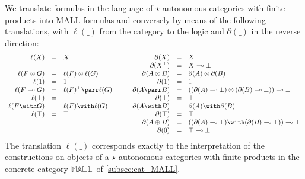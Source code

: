 \documentclass{lmcs}
\newcommand*{\orth}{^\perp} %
\newcommand*{\tens}{\otimes} %
\newcommand*{\lolipop}{\multimap} %
\newcommand*{\MALL}{\ensuremath{\mathbb{MALL}}}
\newcommand*{\tradm}[1]{\ell(#1)}
\newcommand*{\tradc}[1]{\partial(#1)}
\begin{document}
We translate formulas in the language of $\star$-autonomous categories with finite products into MALL formulas and conversely by means of the following translations, with $\tradm{\_}$ from the category to the logic and $\tradc{\_}$ in the reverse direction:
\begin{equation*}
\begin{array}{rcl@{\qquad\quad}rcl}
  \tradm{X} &=& X & \tradc{X} &=& X \\
  & & & \tradc{X\orth} &=& X\lolipop\bot \\
  \tradm{F\tens G} &=& \tradm{F}\tens\tradm{G} & \tradc{A\tens B} &=& \tradc{A}\tens\tradc{B} \\
  \tradm{1} &=& 1 & \tradc{1} &=& 1\\
  \tradm{F\lolipop G} &=& \tradm{F}\orth\parr\tradm{G} & \tradc{A\parr B} &=& ((\tradc{A}\lolipop\bot)\tens(\tradc{B}\lolipop\bot))\lolipop\bot \\
  \tradm{\bot} &=& \bot & \tradc{\bot} &=& \bot \\
  \tradm{F\with G} &=& \tradm{F}\with\tradm{G} & \tradc{A\with B} &=& \tradc{A}\with\tradc{B} \\
  \tradm{\top} &=& \top & \tradc{\top} &=& \top \\
  & & & \tradc{A\oplus B} &=& ((\tradc{A}\lolipop\bot)\with(\tradc{B}\lolipop\bot))\lolipop\bot \\
  & & & \tradc{0} &=& \top\lolipop\bot
\end{array}
\end{equation*}
The translation $\tradm{\_}$ corresponds exactly to the interpretation of the constructions on objects of a $\star$-autonomous categories with finite products in the concrete category \MALL\ of \autoref{subsec:cat_MALL}.
\end{document}
